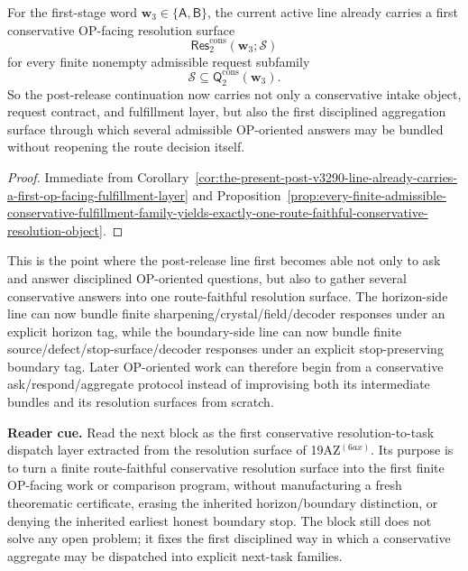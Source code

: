 \begin{corollary}
\label{cor:the-present-post-v3290-line-already-carries-a-first-op-facing-conservative-resolution-surface}
For the first-stage word \(\mathbf w_3\in\{\mathsf A,\mathsf B\}\), the current active line already carries a first conservative OP-facing resolution surface
\[
  \mathsf{Res}^{\mathrm{cons}}_{2}(\mathbf w_3;\mathcal S)
\]
for every finite nonempty admissible request subfamily
\[
  \mathcal S\subseteq \mathsf{Q}^{\mathrm{cons}}_{2}(\mathbf w_3).
\]
So the post-release continuation now carries not only a conservative intake object, request contract, and fulfillment layer, but also the first disciplined aggregation surface through which several admissible OP-oriented answers may be bundled without reopening the route decision itself.
\end{corollary}

\begin{proof}
Immediate from Corollary~\ref{cor:the-present-post-v3290-line-already-carries-a-first-op-facing-fulfillment-layer} and Proposition~\ref{prop:every-finite-admissible-conservative-fulfillment-family-yields-exactly-one-route-faithful-conservative-resolution-object}.
\end{proof}

\begin{remark}
\label{rem:what-the-first-conservative-op-facing-response-aggregation-resolution-layer-now-buys}
This is the point where the post-release line first becomes able not only to ask and answer disciplined OP-oriented questions, but also to gather several conservative answers into one route-faithful resolution surface. The horizon-side line can now bundle finite sharpening/crystal/field/decoder responses under an explicit horizon tag, while the boundary-side line can now bundle finite source/defect/stop-surface/decoder responses under an explicit stop-preserving boundary tag. Later OP-oriented work can therefore begin from a conservative ask/respond/aggregate protocol instead of improvising both its intermediate bundles and its resolution surfaces from scratch.
\end{remark}


\noindent\textbf{Reader cue.} Read the next block as the first conservative resolution-to-task dispatch layer extracted from the resolution surface of 19AZ$^{(6ax)}$. Its purpose is to turn a finite route-faithful conservative resolution surface into the first finite OP-facing work or comparison program, without manufacturing a fresh theorematic certificate, erasing the inherited horizon/boundary distinction, or denying the inherited earliest honest boundary stop. The block still does not solve any open problem; it fixes the first disciplined way in which a conservative aggregate may be dispatched into explicit next-task families.

